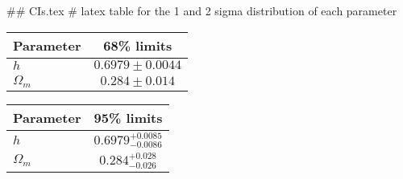 ## CIs.tex
# latex table for the 1 and 2 sigma distribution of each parameter

\begin{tabular} { l  c}
 Parameter &  68\% limits\\
\hline
{\boldmath$h              $} & $0.6979\pm 0.0044          $\\
{\boldmath$\Omega_m       $} & $0.284\pm 0.014            $\\
\hline
\end{tabular}

\begin{tabular} { l  c}
 Parameter &  95\% limits\\
\hline
{\boldmath$h              $} & $0.6979^{+0.0085}_{-0.0086}$\\
{\boldmath$\Omega_m       $} & $0.284^{+0.028}_{-0.026}   $\\
\hline
\end{tabular}
